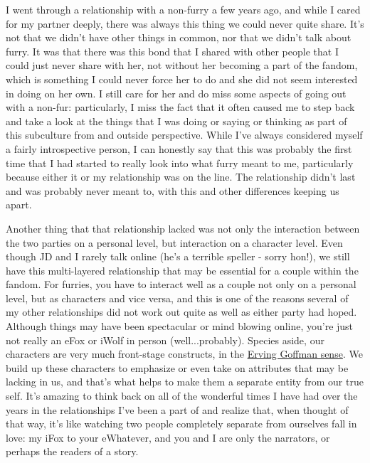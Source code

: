 I went through a relationship with a non-furry a few years ago, and while I cared for my partner deeply, there was always this thing we could never quite share. It's not that we didn't have other things in common, nor that we didn't talk about furry. It was that there was this bond that I shared with other people that I could just never share with her, not without her becoming a part of the fandom, which is something I could never force her to do and she did not seem interested in doing on her own. I still care for her and do miss some aspects of going out with a non-fur: particularly, I miss the fact that it often caused me to step back and take a look at the things that I was doing or saying or thinking as part of this subculture from and outside perspective. While I've always considered myself a fairly introspective person, I can honestly say that this was probably the first time that I had started to really look into what furry meant to me, particularly because either it or my relationship was on the line. The relationship didn't last and was probably never meant to, with this and other differences keeping us apart.

Another thing that that relationship lacked was not only the interaction between the two parties on a personal level, but interaction on a character level. Even though JD and I rarely talk online (he's a terrible speller - sorry hon!), we still have this multi-layered relationship that may be essential for a couple within the fandom. For furries, you have to interact well as a couple not only on a personal level, but as characters and vice versa, and this is one of the reasons several of my other relationships did not work out quite as well as either party had hoped. Although things may have been spectacular or mind blowing online, you're just not really an eFox or iWolf in person (well...probably). Species aside, our characters are very much front-stage constructs, in the \href{http://adjectivespecies.com/2011/12/07/character-versus-self-2/}{Erving Goffman sense}. We build up these characters to emphasize or even take on attributes that may be lacking in us, and that's what helps to make them a separate entity from our true self. It's amazing to think back on all of the wonderful times I have had over the years in the relationships I've been a part of and realize that, when thought of that way, it's like watching two people completely separate from ourselves fall in love: my iFox to your eWhatever, and you and I are only the narrators, or perhaps the readers of a story.

